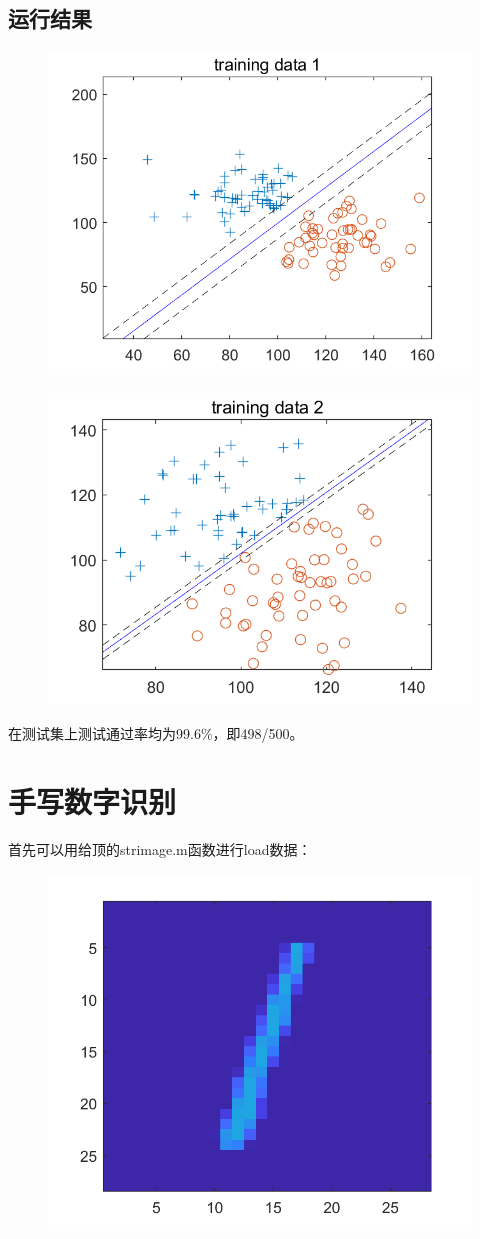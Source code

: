 \documentclass{article}
\begin{document}
\subsection{运行结果}
\begin{figure}[H]
	\centering
	\includegraphics[width=0.6\linewidth]{1.png}
\end{figure}
\begin{figure}[H]
	\centering
	\includegraphics[width=0.6\linewidth]{2.png}
\end{figure}

在测试集上测试通过率均为99.6\%，即498/500。

\section{手写数字识别}
首先可以用给顶的strimage.m函数进行load数据：
\begin{figure}[H]
	\centering
	\includegraphics[width=0.4\linewidth]{6.png}
\end{figure}
\end{document}
